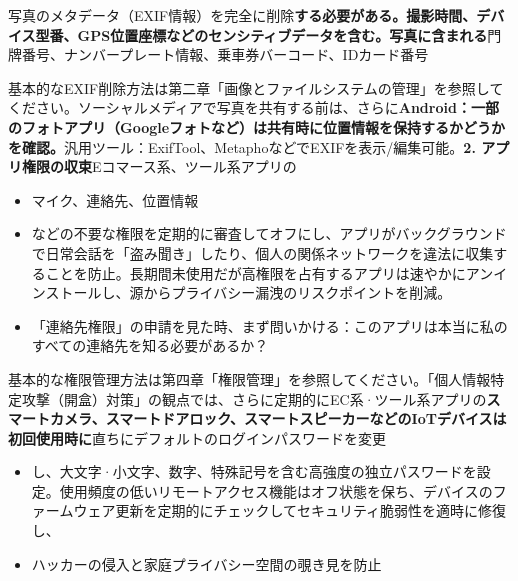 
写真のメタデータ（EXIF情報）を完全に削除\textbf{する必要がある。撮影時間、デバイス型番、GPS位置座標などのセンシティブデータを含む。写真に含まれる}門牌番号、ナンバープレート情報、乗車券バーコード、IDカード番号


基本的なEXIF削除方法は第二章「画像とファイルシステムの管理」を参照してください。ソーシャルメディアで写真を共有する前は、さらに\textbf{Android：一部のフォトアプリ（Googleフォトなど）は共有時に位置情報を保持するかどうかを確認。}汎用ツール：ExifTool、MetaphoなどでEXIFを表示/編集可能。\textbf{2. アプリ権限の収束}Eコマース系、ツール系アプリの

\begin{itemize}
  \item マイク、連絡先、位置情報
  \item などの不要な権限を定期的に審査してオフにし、アプリがバックグラウンドで日常会話を「盗み聞き」したり、個人の関係ネットワークを違法に収集することを防止。長期間未使用だが高権限を占有するアプリは速やかにアンインストールし、源からプライバシー漏洩のリスクポイントを削減。
  \item 「連絡先権限」の申請を見た時、まず問いかける：このアプリは本当に私のすべての連絡先を知る必要があるか？
\end{itemize}


基本的な権限管理方法は第四章「権限管理」を参照してください。「個人情報特定攻撃（開盒）対策」の観点では、さらに定期的にEC系·ツール系アプリの\textbf{スマートカメラ、スマートドアロック、スマートスピーカーなどのIoTデバイスは初回使用時に}直ちにデフォルトのログインパスワードを変更

\begin{itemize}
  \item し、大文字·小文字、数字、特殊記号を含む高強度の独立パスワードを設定。使用頻度の低いリモートアクセス機能はオフ状態を保ち、デバイスのファームウェア更新を定期的にチェックしてセキュリティ脆弱性を適時に修復し、
  \item ハッカーの侵入と家庭プライバシー空間の覗き見を防止
\end{itemize}


